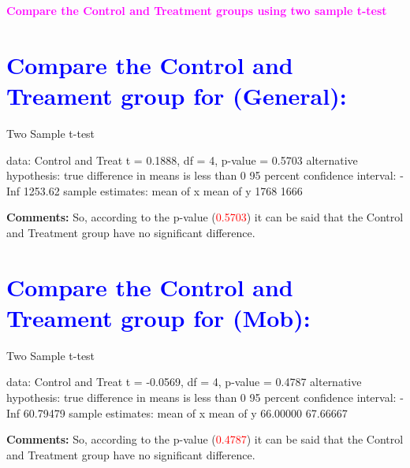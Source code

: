 \documentclass{article}
\begin{document}


\begin{titlepage}
    \begin{center}
        \vspace*{1cm}
        
        \LARGE
       \textbf{\textcolor{magenta}{Compare the Control and Treatment groups using two sample t-test}}
        
        
      
        
        
        
     \end{center}
\end{titlepage}





\section*{\textcolor{blue}{Compare the Control and Treament group for (General):}}
\begin{Schunk}
\begin{Soutput}
	Two Sample t-test

data:  Control and Treat
t = 0.1888, df = 4, p-value = 0.5703
alternative hypothesis: true difference in means is less than 0
95 percent confidence interval:
    -Inf 1253.62
sample estimates:
mean of x mean of y 
     1768      1666 
\end{Soutput}
\end{Schunk}
\textbf{Comments:} So, according to the p-value (\textcolor{red}{0.5703}) it can be said that the Control and Treatment group have no significant difference.


\section*{\textcolor{blue}{Compare the Control and Treament group for (Mob):}}
\begin{Schunk}
\begin{Soutput}
	Two Sample t-test

data:  Control and Treat
t = -0.0569, df = 4, p-value = 0.4787
alternative hypothesis: true difference in means is less than 0
95 percent confidence interval:
     -Inf 60.79479
sample estimates:
mean of x mean of y 
 66.00000  67.66667 
\end{Soutput}
\end{Schunk}
\textbf{Comments:} So, according to the p-value (\textcolor{red}{0.4787}) it can be said that the Control and Treatment group have no significant difference.
\end{document}

